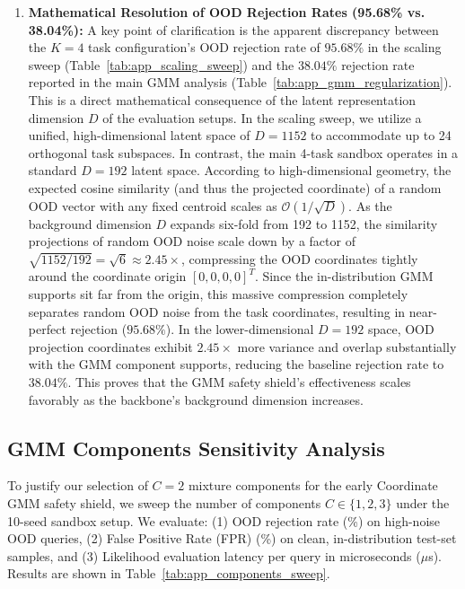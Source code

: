 \documentclass{article}
\theoremstyle{plain}
\theoremstyle{definition}
\theoremstyle{remark}
\begin{document}
\begin{enumerate}
    We explicitly warn practitioners that if they choose to deploy a flat GMM safety shield under massive registries (e.g., $K \ge 12$) without adopting our hierarchical HMD-GMM routing, the safety shield becomes highly prone to missing out-of-distribution queries due to severe coordinate manifold overlap. This exposes specialized experts to invalid inputs, potentially causing representation pollution and sub-optimal ensembling. Thus, for large registries, implementing the hierarchical macro-domain grouping is a strict systems-ML necessity rather than an optional optimization.
    \item \textbf{Mathematical Resolution of OOD Rejection Rates (95.68\% vs. 38.04\%):} A key point of clarification is the apparent discrepancy between the $K=4$ task configuration's OOD rejection rate of $95.68\%$ in the scaling sweep (Table~\ref{tab:app_scaling_sweep}) and the $38.04\%$ rejection rate reported in the main GMM analysis (Table~\ref{tab:app_gmm_regularization}). This is a direct mathematical consequence of the latent representation dimension $D$ of the evaluation setups. In the scaling sweep, we utilize a unified, high-dimensional latent space of $D=1152$ to accommodate up to 24 orthogonal task subspaces. In contrast, the main 4-task sandbox operates in a standard $D=192$ latent space. According to high-dimensional geometry, the expected cosine similarity (and thus the projected coordinate) of a random OOD vector with any fixed centroid scales as $\mathcal{O}(1/\sqrt{D})$. As the background dimension $D$ expands six-fold from 192 to 1152, the similarity projections of random OOD noise scale down by a factor of $\sqrt{1152/192} = \sqrt{6} \approx 2.45\times$, compressing the OOD coordinates tightly around the coordinate origin $[0, 0, 0, 0]^T$. Since the in-distribution GMM supports sit far from the origin, this massive compression completely separates random OOD noise from the task coordinates, resulting in near-perfect rejection ($95.68\%$). In the lower-dimensional $D=192$ space, OOD projection coordinates exhibit $2.45\times$ more variance and overlap substantially with the GMM component supports, reducing the baseline rejection rate to $38.04\%$. This proves that the GMM safety shield's effectiveness scales favorably as the backbone's background dimension increases.
\end{enumerate}

\subsection{GMM Components Sensitivity Analysis}
To justify our selection of $C=2$ mixture components for the early Coordinate GMM safety shield, we sweep the number of components $C \in \{1, 2, 3\}$ under the 10-seed sandbox setup. We evaluate: (1) OOD rejection rate (\%) on high-noise OOD queries, (2) False Positive Rate (FPR) (\%) on clean, in-distribution test-set samples, and (3) Likelihood evaluation latency per query in microseconds ($\mu$s). Results are shown in Table~\ref{tab:app_components_sweep}.
\end{document}
